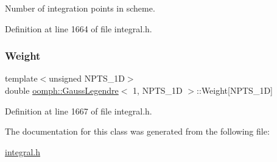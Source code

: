 Number of integration points in scheme. 



Definition at line 1664 of file integral.\+h.

\mbox{\label{classoomph_1_1GaussLegendre_3_011_00_01NPTS__1D_01_4_a3c07e73cbed3ba2fa1dacc67287609ea}} 
\subsubsection{\texorpdfstring{Weight}{Weight}}
{\footnotesize\ttfamily template$<$unsigned N\+P\+T\+S\+\_\+1D$>$ \\
double \hyperlink{classoomph_1_1GaussLegendre}{oomph\+::\+Gauss\+Legendre}$<$ 1, N\+P\+T\+S\+\_\+1D $>$\+::Weight\mbox{[}N\+P\+T\+S\+\_\+1D\mbox{]}\hspace{0.3cm}{\ttfamily [private]}}



Definition at line 1667 of file integral.\+h.



The documentation for this class was generated from the following file\+:\begin{DoxyCompactItemize}
\item 
\hyperlink{integral_8h}{integral.\+h}\end{DoxyCompactItemize}
